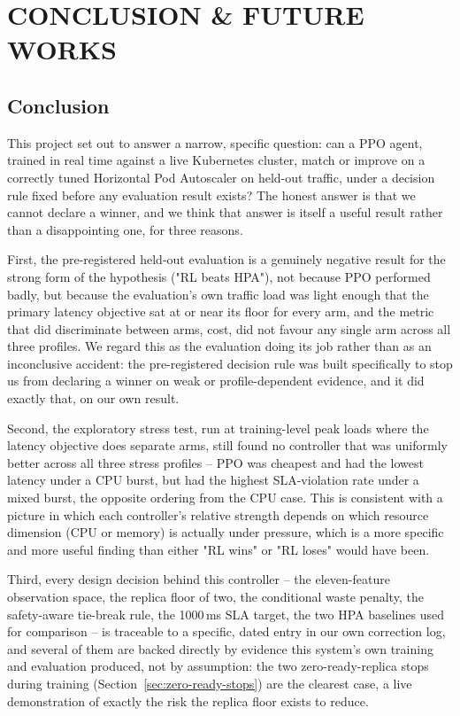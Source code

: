 \chapter{CONCLUSION \& FUTURE WORKS}
\label{ch:conclusion}

\section{Conclusion}
\label{sec:conclusion-body}

This project set out to answer a narrow, specific question: can a PPO
agent, trained in real time against a live Kubernetes cluster, match or
improve on a correctly tuned Horizontal Pod Autoscaler on held-out traffic,
under a decision rule fixed before any evaluation result exists? The
honest answer is that we cannot declare a winner, and we think that answer
is itself a useful result rather than a disappointing one, for three
reasons.

First, the pre-registered held-out evaluation is a genuinely negative
result for the strong form of the hypothesis ("RL beats HPA"), not because
PPO performed badly, but because the evaluation's own traffic load was
light enough that the primary latency objective sat at or near its floor
for every arm, and the metric that did discriminate between arms, cost,
did not favour any single arm across all three profiles. We regard this as
the evaluation doing its job rather than as an inconclusive accident: the
pre-registered decision rule was built specifically to stop us from
declaring a winner on weak or profile-dependent evidence, and it did
exactly that, on our own result.

Second, the exploratory stress test, run at training-level peak loads
where the latency objective does separate arms, still found no controller
that was uniformly better across all three stress profiles -- PPO was
cheapest and had the lowest latency under a CPU burst, but had the highest
SLA-violation rate under a mixed burst, the opposite ordering from the CPU
case. This is consistent with a picture in which each controller's
relative strength depends on which resource dimension (CPU or memory) is
actually under pressure, which is a more specific and more useful finding
than either "RL wins" or "RL loses" would have been.

Third, every design decision behind this controller -- the eleven-feature
observation space, the replica floor of two, the conditional waste
penalty, the safety-aware tie-break rule, the 1000\,ms SLA target, the two
HPA baselines used for comparison -- is traceable to a specific, dated
entry in our own correction log, and several of them are backed directly
by evidence this system's own training and evaluation produced, not by
assumption: the two zero-ready-replica stops during training
(Section~\ref{sec:zero-ready-stops}) are the clearest case, a live
demonstration of exactly the risk the replica floor exists to reduce.

